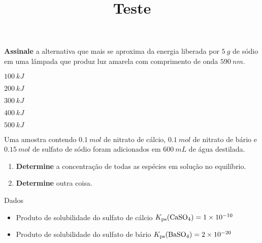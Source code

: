 \documentclass[IMEdis]{braun}
\title{Teste}
\begin{document}
\maketitle


\begin{problem}[
	points={10}
]
\textbf{Assinale} a alternativa que mais se aproxima da energia liberada
por {\(\qty{5}{g}\)} de sódio em uma lâmpada que produz luz amarela com
comprimento de onda {\(\qty{590}{nm}\)}.

\begin{choices}
\item {\(\qty{100}{kJ}\)}

\item {\(\qty{200}{kJ}\)}

\item {\(\qty{300}{kJ}\)}

\item {\(\qty{400}{kJ}\)}

\item {\(\qty{500}{kJ}\)}

\end{choices}

\end{problem}


\begin{problem}[
	points={10}
]
Uma amostra contendo {\(\qty{0,1}{mol}\)} de nitrato de cálcio,
{\(\qty{0,1}{mol}\)} de nitrato de bário e {\(\qty{0,15}{mol}\)} de
sulfato de sódio foram adicionados em {\(\qty{600}{mL}\)} de água
destilada.

\begin{enumerate}
\def\labelenumi{\alph{enumi}.}
\tightlist
\item
  \textbf{Determine} a concentração de todas as espécies em solução no
  equilíbrio.
\item
  \textbf{Determine} outra coisa.
\end{enumerate}

Dados

\begin{itemize}
\tightlist
\item
  Produto de solubilidade do sulfato de cálcio
  {\(K_\mathrm{ps}(\ce{CaSO4}) = \num{1e-10}\)}
\item
  Produto de solubilidade do sulfato de bário
  {\(K_\mathrm{ps}(\ce{BaSO4}) = \num{2e-20}\)}
\end{itemize}

\end{problem}
\end{document}
